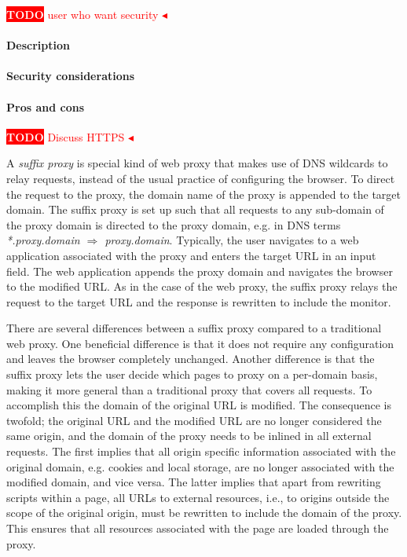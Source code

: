 \documentclass{llncs}
\newcommand{\todo}[1]{\colorbox{red}{\textcolor{white}{\sffamily\bfseries\scriptsize TODO}} \textcolor{red}{#1} \textcolor{red}{$\blacktriangleleft$}}
\begin{document}
\todo{user who want security}

\paragraph{Description}

\paragraph{Security considerations}

\paragraph{Pros and cons}

\todo{Discuss HTTPS}


A \emph{suffix proxy} is special kind of web proxy that makes use of DNS wildcards to 
relay requests, instead of the usual practice of configuring the browser.
To direct the request to the proxy, the domain name of the 
proxy is appended to the target domain. The suffix proxy is set up such
that all requests to any sub-domain of the proxy domain is directed to the proxy domain, 
e.g. in DNS terms \emph{*.proxy.domain $\Rightarrow$ proxy.domain}. Typically, the user navigates to a 
web application associated with the proxy and enters the target URL in 
an input field. The web application appends the proxy domain and navigates the 
browser to the modified URL. As in the case of the web proxy, the suffix proxy 
relays the request to the target URL and the response is rewritten to include 
the monitor.

There are several differences between a suffix proxy compared to a traditional 
web proxy. One beneficial difference is that it does not require any configuration and leaves the browser 
completely unchanged. Another difference is that the suffix proxy lets the user decide which pages to proxy on a 
per-domain basis, making it more general than a traditional proxy that covers 
all requests. To accomplish this the domain of the original URL is modified.
The consequence is twofold; the original URL and the modified URL are no longer 
considered the same origin, and the domain of the proxy needs to 
be inlined in all external requests. The first implies that all origin specific 
information associated with the original domain, e.g. cookies and local storage, 
are no longer associated with the modified domain, and vice versa. 
The latter implies that apart from rewriting scripts within a page, all URLs to 
external resources, i.e., to origins outside the scope of the original origin, 
must be rewritten to include the domain of the proxy. This ensures that all 
resources associated with the page are loaded through the proxy.
\end{document}
